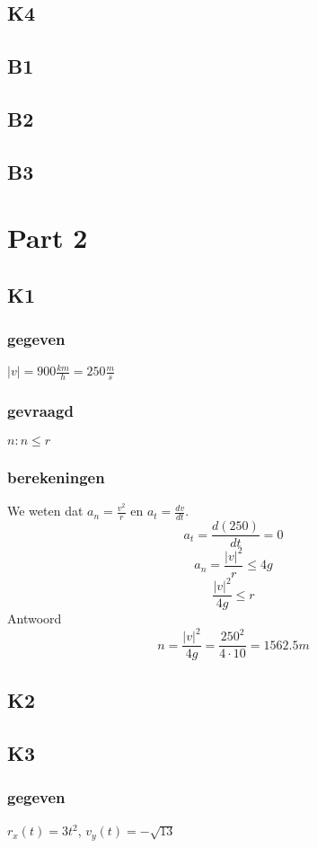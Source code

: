 \documentclass[10pt,a4paper]{article}
\begin{document}
\subsection{K4}

\subsection{B1}

\subsection{B2}

\subsection{B3}

\section{Part 2}
\subsection{K1}
\subsubsection*{gegeven}
$|v|= 900\frac{km}{h} = 250\frac{m}{s}$
\subsubsection*{gevraagd}
$n: n \le r$
\subsubsection*{berekeningen}
We weten dat $a_n=\frac{v^2}{r}$ en  $a_t = \frac{dv}{dt}$.
\[
a_t=\frac{d(250)}{dt} = 0
\]
\[
a_n = \frac{|v|^2}{r} \le 4g
\]
\[
\frac{|v|^2}{4g}\le r
\]
Antwoord
\[
n= \frac{|v|^2}{4g} = \frac{250^2}{4 \cdot 10} = 1562.5m
\]

\subsection{K2}

\subsection{K3}
\subsubsection*{gegeven}
$r_{x}(t) = 3t^{2}$, 
$v_{y}(t)= -\sqrt{13}$
\end{document}
